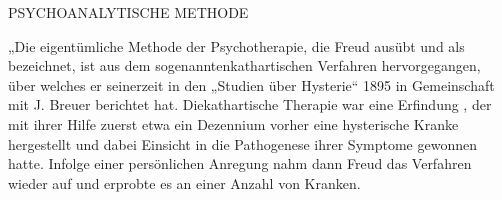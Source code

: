 \documentclass[twoside=true,titlepage=false,open=any, parskip=never, fontsize=10pt, headings=small, chapterprefix=false, appendixprefix=false]{scrbook}
\begin{document}
        \beginnumbering
        
            
            
            
        \pstart
        
               
                   PSYCHOANALYTISCHE METHODE
               
            
        \pend
    
            
        \pstart
        „Die eigentümliche Methode der Psychotherapie, die Freud ausübt und als  bezeichnet, ist aus dem sogenanntenkathartischen Verfahren hervorgegangen,
               über welches er seinerzeit in den „Studien über Hysterie“ 1895 in
               Gemeinschaft mit
               J. Breuer berichtet
               hat. Diekathartische
                  Therapie war eine Erfindung , der mit ihrer Hilfe zuerst etwa ein Dezennium vorher
               eine hysterische Kranke hergestellt und dabei Einsicht in die Pathogenese ihrer Symptome gewonnen
               hatte. Infolge einer persönlichen Anregung  nahm dann Freud das Verfahren
               wieder auf und erprobte es an einer  Anzahl von Kranken.
        \pend
    
\end{document}
